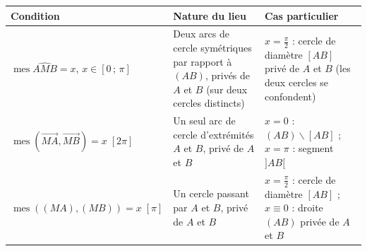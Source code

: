\documentclass[11pt]{article}
\def\setminus{\mathbin{\backslash}}\let\smallsetminus\setminus
\begin{document}
\begin{aretenir}
\begin{center}
\begin{tabularx}{\linewidth}{|l|X|X|}
\hline
\rowcolor{popblueL} \textbf{Condition} & \textbf{Nature du lieu} & \textbf{Cas particulier} \\
\hline
$\operatorname{mes}\widehat{AMB} = x$, $x \in [0\,;\,\pi]$ & Deux arcs de cercle symétriques par rapport à $(AB)$, privés de $A$ et $B$ (sur deux cercles distincts) & $x = \frac{\pi}{2}$ : cercle de diamètre $[AB]$ privé de $A$ et $B$ (les deux cercles se confondent) \\
\hline
$\operatorname{mes}(\overrightarrow{MA},\overrightarrow{MB}) = x \;[2\pi]$ & Un seul arc de cercle d'extrémités $A$ et $B$, privé de $A$ et $B$ & $x = 0$ : $(AB)\setminus[AB]$ ; $x = \pi$ : segment $]AB[$ \\
\hline
$\operatorname{mes}((MA),(MB)) = x \;[\pi]$ & Un cercle passant par $A$ et $B$, privé de $A$ et $B$ & $x = \frac{\pi}{2}$ : cercle de diamètre $[AB]$ ; $x \equiv 0$ : droite $(AB)$ privée de $A$ et $B$ \\
\hline
\end{tabularx}
\end{center}
\end{aretenir}
\end{document}
